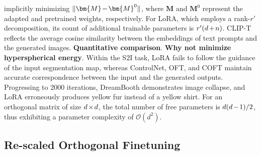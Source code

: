 implicitly minimizing $\thickmuskip=2mu \medmuskip=2mu \| \bm{M} - \bm{M}^0\|$, where $\bm{M}$ and $\bm{M}^0$ represent the adapted and pretrained weights, respectively. For LoRA, which employs a rank-$r'$ decomposition, its count of additional trainable parameters is $\thickmuskip=2mu \medmuskip=2mu r'(d+n)$. CLIP-T reflects the average cosine similarity between the embeddings of text prompts and the generated images. \textbf{Quantitative comparison}. \textbf{Why not minimize hyperspherical energy}. Within the S2I task, LoRA fails to follow the guidance of the input segmentation map, whereas ControlNet, OFT, and COFT maintain accurate correspondence between the input and the generated outputs. Progressing to 2000 iterations, DreamBooth demonstrates image collapse, and LoRA erroneously produces yellow fur instead of a yellow shirt. For an orthogonal matrix of size $\thickmuskip=2mu \medmuskip=2mu d\times d$, the total number of free parameters is $\thickmuskip=2mu \medmuskip=2mu d(d-1)/2$, thus exhibiting a parameter complexity of $\mathcal{O}(d^2)$. \subsection{Re-scaled Orthogonal Finetuning}

